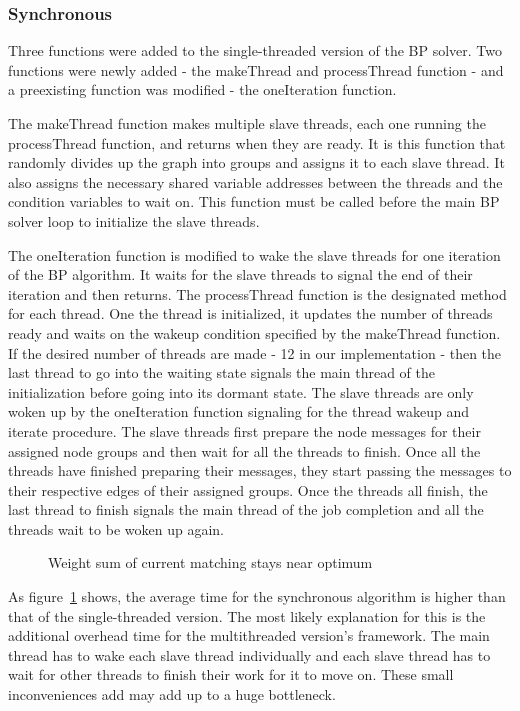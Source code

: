 \subsubsection{Synchronous}
Three functions were added to the single-threaded version of the BP solver. Two functions were newly added - the makeThread and processThread function - and a preexisting function was modified - the oneIteration function. 

The makeThread function makes multiple slave threads, each one running the processThread function, and returns when they are ready. It is this function that randomly divides up the graph into groups and assigns it to each slave thread. It also assigns the necessary shared variable addresses between the threads and the condition variables to wait on. This function must be called before the main BP solver loop to initialize the slave threads.

The oneIteration function is modified to wake the slave threads for one iteration of the BP algorithm. It waits for the slave threads to signal the end of their iteration and then returns.
The processThread function is the designated method for each thread. One the thread is initialized, it updates the number of threads ready and waits on the wakeup condition specified by the makeThread function. If the desired number of threads are made - 12 in our implementation - then the last thread to go into the waiting state signals the main thread of the initialization before going into its dormant state. The slave threads are only woken up by the oneIteration function signaling for the thread wakeup and iterate procedure. The slave threads first prepare the node messages for their assigned node groups and then wait for all the threads to finish. Once all the threads have finished preparing their messages, they start passing the messages to their respective edges of their assigned groups. Once the threads all finish, the last thread to finish signals the main thread of the job completion and all the threads wait to be woken up again.

\begin{figure}
\centering
\caption{Weight sum of current matching stays near optimum}
\label{fig:bd1}
\end{figure}
As figure~\ref{fig:bd1} shows, the average time for the synchronous algorithm is higher than that of the single-threaded version. The most likely explanation for this is the additional overhead time for the multithreaded version's framework. The main thread has to wake each slave thread individually and each slave thread has to wait for other threads to finish their work for it to move on. These small inconveniences add may add up to a huge bottleneck.

